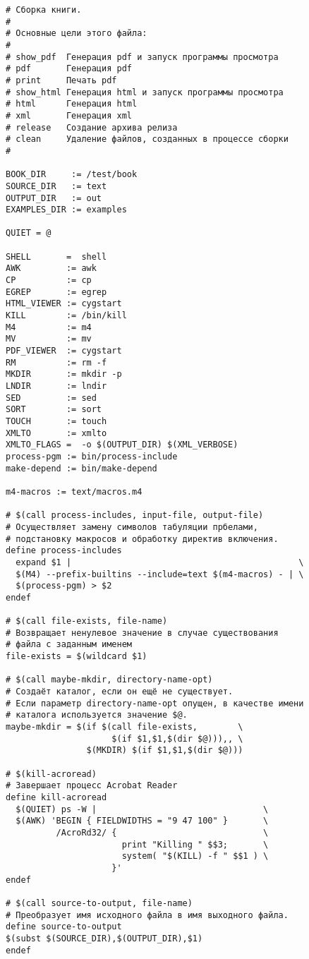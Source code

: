\begin{verbatim}
# Сборка книги.
#
# Основные цели этого файла:
#
# show_pdf  Генерация pdf и запуск программы просмотра
# pdf       Генерация pdf
# print     Печать pdf
# show_html Генерация html и запуск программы просмотра
# html      Генерация html
# xml       Генерация xml
# release   Создание архива релиза
# clean     Удаление файлов, созданных в процессе сборки
#

BOOK_DIR     := /test/book
SOURCE_DIR   := text
OUTPUT_DIR   := out
EXAMPLES_DIR := examples

QUIET = @

SHELL       =  shell
AWK         := awk
CP          := cp
EGREP       := egrep
HTML_VIEWER := cygstart
KILL        := /bin/kill
M4          := m4
MV          := mv
PDF_VIEWER  := cygstart
RM          := rm -f
MKDIR       := mkdir -p
LNDIR       := lndir
SED         := sed
SORT        := sort
TOUCH       := touch
XMLTO       := xmlto
XMLTO_FLAGS =  -o $(OUTPUT_DIR) $(XML_VERBOSE)
process-pgm := bin/process-include
make-depend := bin/make-depend

m4-macros := text/macros.m4

# $(call process-includes, input-file, output-file)
# Осуществляет замену символов табуляции прбелами,
# подстановку макросов и обработку директив включения.
define process-includes
  expand $1 |                                             \
  $(M4) --prefix-builtins --include=text $(m4-macros) - | \
  $(process-pgm) > $2
endef

# $(call file-exists, file-name)
# Возвращает ненулевое значение в случае существования
# файла с заданным именем
file-exists = $(wildcard $1)

# $(call maybe-mkdir, directory-name-opt)
# Создаёт каталог, если он ещё не существует.
# Если параметр directory-name-opt опущен, в качестве имени
# каталога используется значение $@.
maybe-mkdir = $(if $(call file-exists,        \
                     $(if $1,$1,$(dir $@))),, \
                $(MKDIR) $(if $1,$1,$(dir $@)))

# $(kill-acroread)
# Завершает процесс Acrobat Reader
define kill-acroread
  $(QUIET) ps -W |                                 \
  $(AWK) 'BEGIN { FIELDWIDTHS = "9 47 100" }       \
          /AcroRd32/ {                             \
                       print "Killing " $$3;       \
                       system( "$(KILL) -f " $$1 ) \
                     }'
endef

# $(call source-to-output, file-name)
# Преобразует имя исходного файла в имя выходного файла.
define source-to-output
$(subst $(SOURCE_DIR),$(OUTPUT_DIR),$1)
endef


\end{verbatim}
